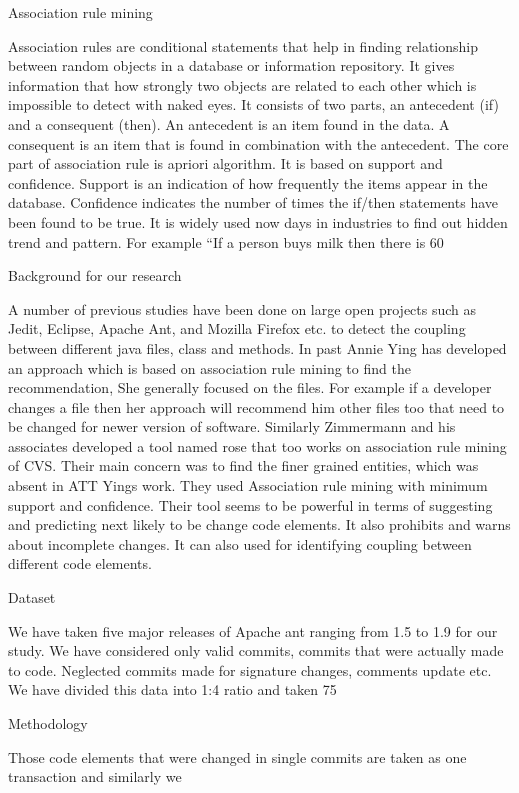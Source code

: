 Association rule mining

Association rules are conditional statements that help in finding relationship between random objects in a database or information repository. It gives information that how strongly two objects are related to each other which is impossible to detect with naked eyes.
It consists of two parts, an antecedent (if) and a consequent (then).  An antecedent is an item found in the data. A consequent is an item that is found in combination with the antecedent.
The core part of association rule is apriori algorithm. It is based on support and confidence. Support is an indication of how frequently the items appear in the database. Confidence indicates the number of times the if/then statements have been found to be true.
It is widely used now days in industries to find out hidden trend and pattern. 
For example “If a person buys milk then there is 60%

Background for our research

A number of previous studies have been done on large open projects such as Jedit, Eclipse, Apache Ant, and Mozilla Firefox etc. to detect the coupling between different java files, class and methods. In past Annie Ying has developed an approach which is based on association rule mining to find the recommendation, She generally focused on the files. For example if a developer changes a file then her approach will recommend him other files too that need to be changed for newer version of software. Similarly Zimmermann and his associates developed a tool named rose that too works on association rule mining of CVS. Their main concern was to find the finer grained entities, which was absent in ATT Yings work. They used Association rule mining with minimum support and confidence. Their tool seems to be powerful in terms of suggesting and predicting next likely to be change code elements. It also prohibits and warns about incomplete changes. It can also used for identifying coupling between different code elements.

Dataset

We have taken five major releases of Apache ant ranging from 1.5 to 1.9 for our study. We have considered only valid commits, commits that were actually made to code. Neglected commits made for signature changes, comments update etc. We have divided this data into 1:4 ratio and taken 75%

Methodology

Those code elements that were changed in single commits are taken as one transaction and similarly we 



